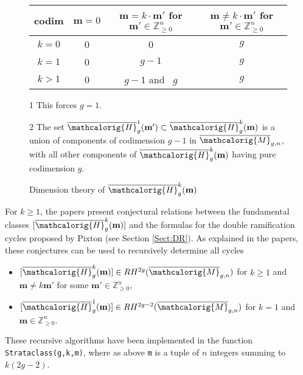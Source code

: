 \documentclass[11pt]{article}
\newcommand{\M}{\ensuremath{\overline{\mathcalorig{M}}}}
\begin{document}
\begin{figure}[ht]
\begin{center}
\begin{threeparttable}[b]
    \begin{tabular}{c|c|c|c}
    codim & $\textbf{m}=0$ & $\textbf{m}=k \cdot \textbf{m}'$ for $\textbf{m}' \in \mathbb{Z}^n_{\geq 0}$ & $\textbf{m} \neq k \cdot \textbf{m}'$ for $\textbf{m}' \in \mathbb{Z}^n_{\geq 0}$ \\ \hline
    $k=0$ & 0 & 0 & $g$\\
    $k=1$ & 0\tnote{1} & $g-1$ & $g$\\
    $k>1$ & 0\tnote{1} & $g-1$ and\tnote{2}~ $g$ & $g$
    \end{tabular}

\begin{tiny}
\begin{tablenotes}
\item [1] This forces $g=1$.
\item [2] The set $\overline{\mathcalorig{H}}_g^1(\textbf{m}') \subset \overline{\mathcalorig{H}}_g^k(\textbf{m})$ is a union of components of codimension $g-1$ in $\M_{g,n}$, with all other components of $\overline{\mathcalorig{H}}_g^k(\textbf{m})$ having pure codimension $g$.
\end{tablenotes}
\end{tiny}
\end{threeparttable}
    \end{center}
\caption{Dimension theory of $\overline{\mathcalorig{H}}_g^k(\textbf{m})$}
\end{figure}

For $k \geq 1$, the papers \cite{FP, SchmittDimension} present conjectural relations between the fundamental classes $[\overline{\mathcalorig{H}}_g^k(\textbf{m})]$ and the formulas for the double ramification cycles proposed by Pixton (see Section \ref{Sect:DR}). As explained in the papers, these conjectures can be used to recursively determine all cycles
\begin{itemize}
    \item $[\overline{\mathcalorig{H}}_g^k(\textbf{m})] \in RH^{2g}(\M_{g,n})$ for $k \geq 1$ and $\textbf{m} \neq k \textbf{m}'$ for some $\textbf{m}' \in \mathbb{Z}_{\geq 0}^n$,
    \item $[\overline{\mathcalorig{H}}_g^1(\textbf{m})] \in RH^{2g-2}(\M_{g,n})$ for $k = 1$ and $\textbf{m}  \in \mathbb{Z}_{\geq 0}^n$.
\end{itemize}
These recursive algorithms have been implemented in the function \texttt{Strataclass(g,k,m)}, where as above \texttt{m} is a tuple of $n$ integers summing to $k(2g-2)$.
\end{document}
